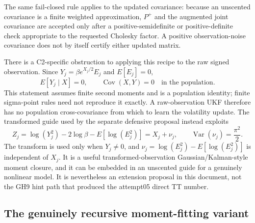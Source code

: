\documentclass[11pt]{article}
\begin{document}
The same fail-closed rule applies to the updated covariance: because an
unscented covariance is a finite weighted approximation, $P^+$ and the
augmented joint covariance are accepted only after a positive-semidefinite or
positive-definite check appropriate to the requested Cholesky factor.  A
positive observation-noise covariance does not by itself certify either
updated matrix.

There is a C2-specific obstruction to applying this recipe to the raw signed
observation.  Since $Y_j=\beta e^{X_j/2}E_j$ and $E[E_j]=0$,
\begin{equation}
  E[Y_j\mid X]=0,
  \qquad \operatorname{Cov}(X,Y)=0
  \quad\text{in the population}.
  \label{eq:actual-raw-ukf-zero-gain}
\end{equation}
This statement assumes finite second moments and is a population identity;
finite sigma-point rules need not reproduce it exactly.
A raw-observation UKF therefore has no population cross-covariance from which
to learn the volatility update.  The transformed guide used by the separate
defensive proposal instead exploits
\begin{equation}
  Z_j=\log(Y_j^2)-2\log\beta-E[\log(E_j^2)]
      =X_j+\nu_j,
  \qquad \operatorname{Var}(\nu_j)=\frac{\pi^2}{2}.
  \label{eq:actual-log-square-guide}
\end{equation}
The transform is used only when $Y_j\ne0$, and
$\nu_j=\log(E_j^2)-E[\log(E_j^2)]$ is independent of $X_j$.
It is a useful transformed-observation Gaussian/Kalman-style moment closure,
and it can be embedded in an unscented guide for a genuinely nonlinear model.
It is nevertheless an extension proposal in this document, not the GH9 hint
path that produced the attempt05 direct TT number.

\subsection{The genuinely recursive moment-fitting variant}
\end{document}
